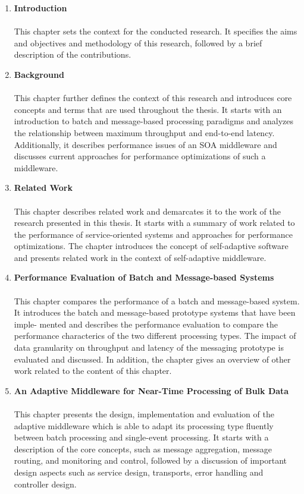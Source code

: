 \begin{enumerate}
	\item \textbf{Introduction}\\\\
	This chapter sets the context for the conducted research. It specifies the aims and objectives and methodology of this research, followed by a brief description of the contributions. 
	\item \textbf{Background}\\\\
	This chapter further defines the context of this research and introduces core concepts and terms that are used throughout the thesis. It starts with an introduction to batch and message-based processing paradigms and analyzes the relationship between maximum throughput and end-to-end latency. Additionally, it describes performance issues of an \ac{SOA} middleware and discusses current approaches for performance optimizations of such a middleware.
	\item \textbf{Related Work}\\\\
	This chapter describes related work and demarcates it to the work of the research presented in this thesis. It starts with a summary of work related to the performance of service-oriented systems and approaches for performance optimizations. The chapter introduces the concept of self-adaptive software and presents related work in the context of self-adaptive middleware.
	\item \textbf{Performance Evaluation of Batch and Message-based Systems}\\\\
	This chapter compares the performance of a batch and message-based system. It introduces the batch and message-based prototype systems that have been imple- mented and describes the performance evaluation to compare the performance characterics of the two different processing types.  The impact of data granularity on throughput and latency of the messaging prototype is evaluated and discussed. In addition, the chapter gives an overview of other work related to the content of this chapter.
	\item \textbf{An Adaptive Middleware for Near-Time Processing of Bulk Data}\\\\
	This chapter presents the design, implementation and evaluation of the adaptive middleware which is able to adapt its processing type fluently between batch processing and single-event processing. It starts with a description of the core concepts, such as message aggregation, message routing, and monitoring and control, followed by a discussion of important design aspects such as service design, transports, error handling and controller design.

\end{enumerate}
